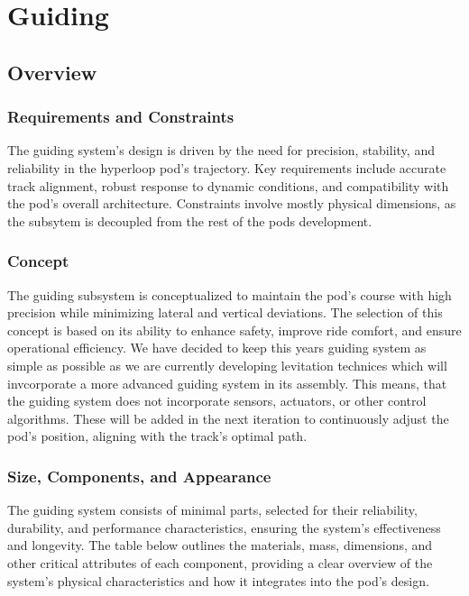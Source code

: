 
\section{Guiding}

\subsection{Overview}

\subsubsection{Requirements and Constraints}
The guiding system's design is driven by the need for precision, stability, and reliability in the hyperloop pod's trajectory. Key requirements include accurate track alignment, robust response to dynamic conditions, and compatibility with the pod's overall architecture. Constraints involve mostly physical dimensions, as the subsytem is decoupled from the rest of the pods development.

\subsubsection{Concept}
The guiding subsystem is conceptualized to maintain the pod's course with high precision while minimizing lateral and vertical deviations. The selection of this concept is based on its ability to enhance safety, improve ride comfort, and ensure operational efficiency. We have decided to keep this years guiding system as simple as possible as we are currently developing levitation technices which will invcorporate a more advanced guiding system in its assembly. This means, that the guiding system does not incorporate sensors, actuators, or other control algorithms. These will be added in the next iteration to continuously adjust the pod's position, aligning with the track's optimal path.

\subsubsection{Size, Components, and Appearance}
The guiding system consists of minimal parts, selected for their reliability, durability, and performance characteristics, ensuring the system's effectiveness and longevity. The table below outlines the materials, mass, dimensions, and other critical attributes of each component, providing a clear overview of the system's physical characteristics and how it integrates into the pod's design.

